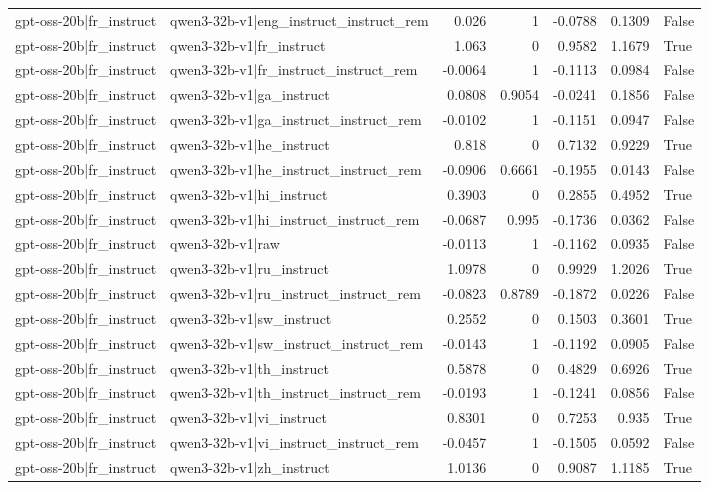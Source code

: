 \begin{table}
\begin{tabular}{l l r r r r l}
gpt-oss-20b|fr_instruct & qwen3-32b-v1|eng_instruct_instruct_rem & 0.026 & 1 & -0.0788 & 0.1309 & False \\
gpt-oss-20b|fr_instruct & qwen3-32b-v1|fr_instruct & 1.063 & 0 & 0.9582 & 1.1679 & True \\
gpt-oss-20b|fr_instruct & qwen3-32b-v1|fr_instruct_instruct_rem & -0.0064 & 1 & -0.1113 & 0.0984 & False \\
gpt-oss-20b|fr_instruct & qwen3-32b-v1|ga_instruct & 0.0808 & 0.9054 & -0.0241 & 0.1856 & False \\
gpt-oss-20b|fr_instruct & qwen3-32b-v1|ga_instruct_instruct_rem & -0.0102 & 1 & -0.1151 & 0.0947 & False \\
gpt-oss-20b|fr_instruct & qwen3-32b-v1|he_instruct & 0.818 & 0 & 0.7132 & 0.9229 & True \\
gpt-oss-20b|fr_instruct & qwen3-32b-v1|he_instruct_instruct_rem & -0.0906 & 0.6661 & -0.1955 & 0.0143 & False \\
gpt-oss-20b|fr_instruct & qwen3-32b-v1|hi_instruct & 0.3903 & 0 & 0.2855 & 0.4952 & True \\
gpt-oss-20b|fr_instruct & qwen3-32b-v1|hi_instruct_instruct_rem & -0.0687 & 0.995 & -0.1736 & 0.0362 & False \\
gpt-oss-20b|fr_instruct & qwen3-32b-v1|raw & -0.0113 & 1 & -0.1162 & 0.0935 & False \\
gpt-oss-20b|fr_instruct & qwen3-32b-v1|ru_instruct & 1.0978 & 0 & 0.9929 & 1.2026 & True \\
gpt-oss-20b|fr_instruct & qwen3-32b-v1|ru_instruct_instruct_rem & -0.0823 & 0.8789 & -0.1872 & 0.0226 & False \\
gpt-oss-20b|fr_instruct & qwen3-32b-v1|sw_instruct & 0.2552 & 0 & 0.1503 & 0.3601 & True \\
gpt-oss-20b|fr_instruct & qwen3-32b-v1|sw_instruct_instruct_rem & -0.0143 & 1 & -0.1192 & 0.0905 & False \\
gpt-oss-20b|fr_instruct & qwen3-32b-v1|th_instruct & 0.5878 & 0 & 0.4829 & 0.6926 & True \\
gpt-oss-20b|fr_instruct & qwen3-32b-v1|th_instruct_instruct_rem & -0.0193 & 1 & -0.1241 & 0.0856 & False \\
gpt-oss-20b|fr_instruct & qwen3-32b-v1|vi_instruct & 0.8301 & 0 & 0.7253 & 0.935 & True \\
gpt-oss-20b|fr_instruct & qwen3-32b-v1|vi_instruct_instruct_rem & -0.0457 & 1 & -0.1505 & 0.0592 & False \\
gpt-oss-20b|fr_instruct & qwen3-32b-v1|zh_instruct & 1.0136 & 0 & 0.9087 & 1.1185 & True \\

\end{tabular}
\end{table}

